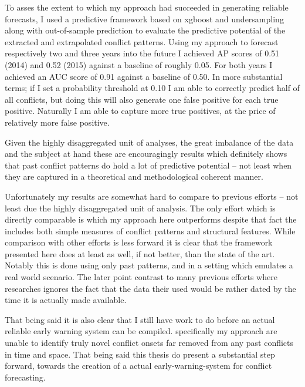 \documentclass[a4paper]{article}
\begin{document}
To asses the extent to which my approach had succeeded in generating reliable forecasts, I used a predictive framework based on xgboost and undersampling along with out-of-sample prediction to evaluate the predictive potential of the extracted and extrapolated conflict patterns. Using my approach to forecast respectively two and three years into the future I achieved AP scores of 0.51 (2014) and 0.52 (2015) against a baseline of roughly 0.05. For both years I achieved an AUC score of 0.91 against a baseline of 0.50. In more substantial terms; if I set a probability threshold at 0.10 I am able to correctly predict half of all conflicts, but doing this will also generate one false positive for each true positive. Naturally I am able to capture more true positives, at the price of relatively more false positive.\par 

Given the highly disaggregated unit of analyses, the great imbalance of the data and the subject at hand these are encouragingly results which definitely shows that past conflict patterns do hold a lot of predictive potential -- not least when they are captured in a theoretical and methodological coherent manner.\par 

Unfortunately my results are somewhat hard to compare to previous efforts -- not least due the highly disaggregated unit of analysis. The only effort which is directly comparable is \cite{Maase} which my approach here outperforms despite that fact the \cite{Maase} includes both simple measures of conflict patterns and structural features. While comparison with other efforts is less forward it is clear that the framework presented here does at least as well, if not better, than the state of the art. Notably this is done using only past patterns, and in a setting which emulates a real world scenario. The later point contrast to many previous efforts where researches ignores the fact that the data their used would be rather dated by the time it is actually made available.

That being said it is also clear that I still have work to do before an actual reliable early warning system can be compiled. specifically my approach are unable to identify truly novel conflict onsets far removed from any past conflicts in time and space. That being said this thesis do present a substantial step forward, towards the creation of a actual early-warning-system for conflict forecasting.\par
\end{document}
